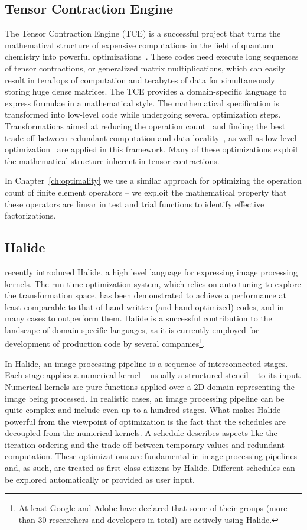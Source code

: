 \subsection{Tensor Contraction Engine}
The Tensor Contraction Engine (TCE) is a successful project that turns the mathematical structure of expensive computations in the field of quantum chemistry into powerful optimizations~\citep{TCE-url}. These codes need execute long sequences of tensor contractions, or generalized matrix multiplications, which can easily result in teraflops of computation and terabytes of data for simultaneously storing huge dense matrices. The TCE provides a domain-specific language to express formulae in a mathematical style. The mathematical specification is transformed into low-level code while undergoing several optimization steps. Transformations aimed at reducing the operation count~\citep{TCE-2006,TCE-2009} and finding the best trade-off between redundant computation and data locality~\citep{TCE-2011}, as well as low-level optimization~\citep{TCE-2012} are applied in this framework. Many of these optimizations exploit the mathematical structure inherent in tensor contractions. 

In Chapter~\ref{ch:optimality} we use a similar approach for optimizing the operation count of finite element operators -- we exploit the mathematical property that these operators are linear in test and trial functions to identify effective factorizations.


\subsection{Halide}
\cite{Halide} recently introduced Halide, a high level language for expressing image processing kernels. The run-time optimization system, which relies on auto-tuning to explore the transformation space, has been demonstrated to achieve a performance at least comparable to that of hand-written (and hand-optimized) codes, and in many cases to outperform them. Halide is a successful contribution to the landscape of domain-specific languages, as it is currently employed for development of production code by several companies\footnote{At least Google and Adobe have declared that some of their groups (more than 30 researchers and developers in total) are actively using Halide.}.

In Halide, an image processing pipeline is a sequence of interconnected stages. Each stage applies a numerical kernel -- usually a structured stencil -- to its input. Numerical kernels are pure functions applied over a 2D domain representing the image being processed. In realistic cases, an image processing pipeline can be quite complex and include even up to a hundred stages. What makes Halide powerful from the viewpoint of optimization is the fact that the schedules are decoupled from the numerical kernels. A schedule describes aspects like the iteration ordering and the trade-off between temporary values and redundant computation. These optimizations are fundamental in image processing pipelines and, as such, are treated as first-class citizens by Halide. Different schedules can be explored automatically or provided as user input.


